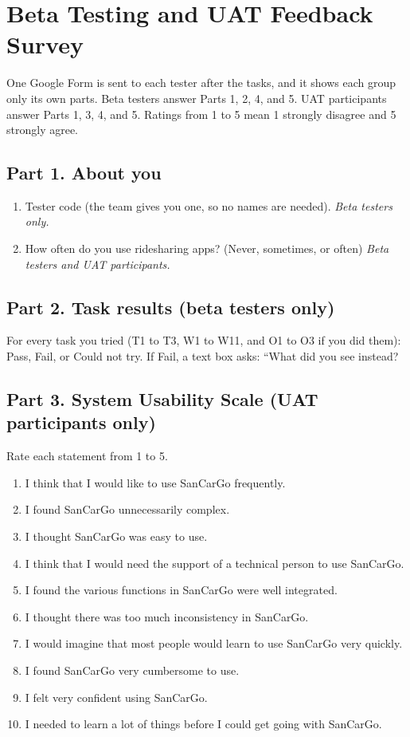 \chapter{Beta Testing and UAT Feedback Survey}
\label{app:survey}
\clearpage

One Google Form is sent to each tester after the tasks, and it shows each group only its own parts. Beta testers answer Parts 1, 2, 4, and 5. UAT participants answer Parts 1, 3, 4, and 5. Ratings from 1 to 5 mean 1 strongly disagree and 5 strongly agree.

\section*{Part 1. About you}
\begin{enumerate}
    \item Tester code (the team gives you one, so no names are needed). \textit{Beta testers only.}
    \item How often do you use ridesharing apps? (Never, sometimes, or often) \textit{Beta testers and UAT participants.}
\end{enumerate}

\section*{Part 2. Task results (beta testers only)}
For every task you tried (T1 to T3, W1 to W11, and O1 to O3 if you did them): Pass, Fail, or Could not try. If Fail, a text box asks: ``What did you see instead?

\section*{Part 3. System Usability Scale (UAT participants only)}
Rate each statement from 1 to 5.
\begin{enumerate}
    \item I think that I would like to use SanCarGo frequently.
    \item I found SanCarGo unnecessarily complex.
    \item I thought SanCarGo was easy to use.
    \item I think that I would need the support of a technical person to use SanCarGo.
    \item I found the various functions in SanCarGo were well integrated.
    \item I thought there was too much inconsistency in SanCarGo.
    \item I would imagine that most people would learn to use SanCarGo very quickly.
    \item I found SanCarGo very cumbersome to use.
    \item I felt very confident using SanCarGo.
    \item I needed to learn a lot of things before I could get going with SanCarGo.
\end{enumerate}

